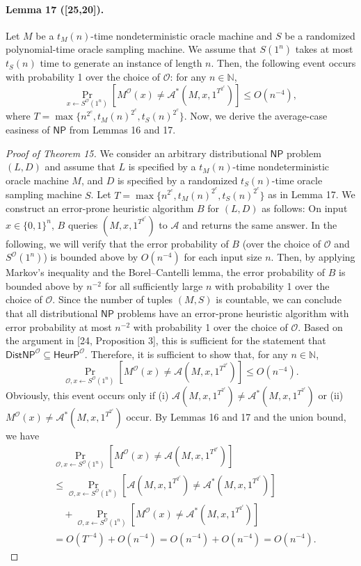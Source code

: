 \paragraph{Lemma 17 ([25,20]).}
Let $M$ be a $t_M(n)$-time nondeterministic oracle machine and $S$ be a randomized polynomial-time oracle sampling machine. We assume that $S(1^n)$ takes at most $t_S(n)$ time to generate an instance of length $n$. Then, the following event occurs with probability 1 over the choice of $\mathcal O$: for any $n\in\mathbb N$,
\[\Pr_{x\leftarrow S^{\mathcal O}(1^n)}[M^{\mathcal O}(x)\neq\mathcal A^*(M,x,1^{T^{2^c}})]\leq O(n^{-4}),\]
where $T=\max\{n^{2^c},t_M(n)^{2^c},t_S(n)^{2^c}\}$.
Now, we derive the average-case easiness of $\mathsf{NP}$ from Lemmas 16 and 17.
\begin{proof}[Proof of Theorem 15]
We consider an arbitrary distributional $\mathsf{NP}$ problem $(L,D)$ and assume that $L$ is specified by a $t_M(n)$-time nondeterministic oracle machine $M$, and $D$ is specified by a randomized $t_S(n)$-time oracle sampling machine $S$. Let $T=\max\{n^{2^c},t_M(n)^{2^c},t_S(n)^{2^c}\}$ as in Lemma 17.
We construct an error-prone heuristic algorithm $B$ for $(L,D)$ as follows: On input $x\in\{0,1\}^n$, $B$ queries $(M,x,1^{T^{2^c}})$ to $\mathcal A$ and returns the same answer. In the following, we will verify that the error probability of $B$ (over the choice of $\mathcal O$ and $S^{\mathcal O}(1^n)$) is bounded above by $O(n^{-4})$ for each input size $n$. Then, by applying Markov's inequality and the Borel--Cantelli lemma, the error probability of $B$ is bounded above by $n^{-2}$ for all sufficiently large $n$ with probability 1 over the choice of $\mathcal O$. Since the number of tuples $(M,S)$ is countable, we can conclude that all distributional $\mathsf{NP}$ problems have an error-prone heuristic algorithm with error probability at most $n^{-2}$ with probability 1 over the choice of $\mathcal O$. Based on the argument in [24, Proposition 3], this is sufficient for the statement that $\mathsf{DistNP}^{\mathcal O}\subseteq\mathsf{HeurP}^{\mathcal O}$.
Therefore, it is sufficient to show that, for any $n\in\mathbb N$,
\[\Pr_{\mathcal O,x\leftarrow S^{\mathcal O}(1^n)}[M^{\mathcal O}(x)\neq\mathcal A(M,x,1^{T^{2^c}})]\leq O(n^{-4}).\]
Obviously, this event occurs only if (i) $\mathcal A(M,x,1^{T^{2^c}})\neq\mathcal A^*(M,x,1^{T^{2^c}})$ or (ii) $M^{\mathcal O}(x)\neq\mathcal A^*(M,x,1^{T^{2^c}})$ occur. By Lemmas 16 and 17 and the union bound, we have
\begin{align*}
&\Pr_{\mathcal O,x\leftarrow S^{\mathcal O}(1^n)}[M^{\mathcal O}(x)\neq\mathcal A(M,x,1^{T^{2^c}})]\\
&\leq\Pr_{\mathcal O,x\leftarrow S^{\mathcal O}(1^n)}[\mathcal A(M,x,1^{T^{2^c}})\neq\mathcal A^*(M,x,1^{T^{2^c}})]\\
&\quad+\Pr_{\mathcal O,x\leftarrow S^{\mathcal O}(1^n)}[M^{\mathcal O}(x)\neq\mathcal A^*(M,x,1^{T^{2^c}})]\\
&=O(T^{-4})+O(n^{-4})=O(n^{-4})+O(n^{-4})=O(n^{-4}).
\end{align*}
\end{proof}
